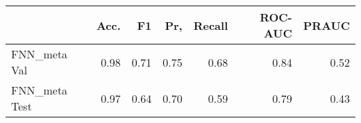 \begin{tabular}{lrrrrrr}
\toprule
{} &  Acc. &    F1 &   Pr, &  Recall &  ROC-AUC &  PRAUC \\
\midrule
FNN\_meta Val  &  0.98 &  0.71 &  0.75 &    0.68 &     0.84 &   0.52 \\
FNN\_meta Test &  0.97 &  0.64 &  0.70 &    0.59 &     0.79 &   0.43 \\
\bottomrule
\end{tabular}
